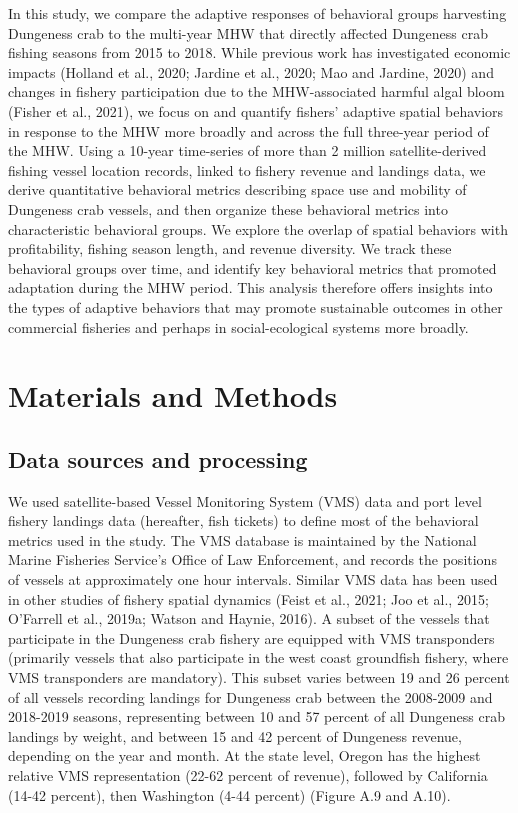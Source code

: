 \documentclass[]{elsarticle} %
\begin{document}
In this study, we compare the adaptive responses of behavioral groups
harvesting Dungeness crab to the multi-year MHW that directly affected
Dungeness crab fishing seasons from 2015 to 2018. While previous work
has investigated economic impacts (Holland et al., 2020; Jardine et al.,
2020; Mao and Jardine, 2020) and changes in fishery participation due to
the MHW-associated harmful algal bloom (Fisher et al., 2021), we focus
on and quantify fishers' adaptive spatial behaviors in response to the
MHW more broadly and across the full three-year period of the MHW. Using
a 10-year time-series of more than 2 million satellite-derived fishing
vessel location records, linked to fishery revenue and landings data, we
derive quantitative behavioral metrics describing space use and mobility
of Dungeness crab vessels, and then organize these behavioral metrics
into characteristic behavioral groups. We explore the overlap of spatial
behaviors with profitability, fishing season length, and revenue
diversity. We track these behavioral groups over time, and identify key
behavioral metrics that promoted adaptation during the MHW period. This
analysis therefore offers insights into the types of adaptive behaviors
that may promote sustainable outcomes in other commercial fisheries and
perhaps in social-ecological systems more broadly.

\hypertarget{methods}{%
\section{Materials and Methods}\label{methods}}

\hypertarget{data-sources-and-processing}{%
\subsection{Data sources and
processing}\label{data-sources-and-processing}}

We used satellite-based Vessel Monitoring System (VMS) data and port
level fishery landings data (hereafter, fish tickets) to define most of
the behavioral metrics used in the study. The VMS database is maintained
by the National Marine Fisheries Service's Office of Law Enforcement,
and records the positions of vessels at approximately one hour
intervals. Similar VMS data has been used in other studies of fishery
spatial dynamics (Feist et al., 2021; Joo et al., 2015; O'Farrell et
al., 2019a; Watson and Haynie, 2016). A subset of the vessels that
participate in the Dungeness crab fishery are equipped with VMS
transponders (primarily vessels that also participate in the west coast
groundfish fishery, where VMS transponders are mandatory). This subset
varies between 19 and 26 percent of all vessels recording landings for
Dungeness crab between the 2008-2009 and 2018-2019 seasons, representing
between 10 and 57 percent of all Dungeness crab landings by weight, and
between 15 and 42 percent of Dungeness revenue, depending on the year
and month. At the state level, Oregon has the highest relative VMS
representation (22-62 percent of revenue), followed by California (14-42
percent), then Washington (4-44 percent) (Figure A.9 and A.10).
\end{document}
